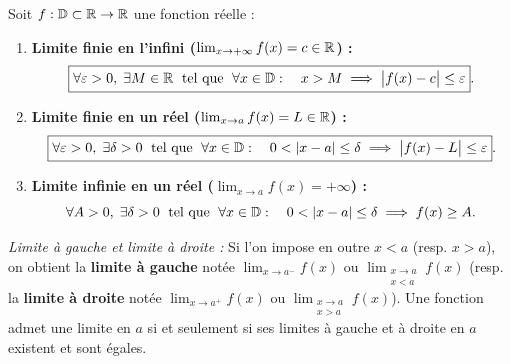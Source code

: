 \begin{definition}
Soit $f : \mathbb{D} \subset \mathbb{R} \to \mathbb{R}$ une fonction réelle :
\begin{enumerate}
    \item \textbf{Limite finie en l'infini ($\lim_{x \to +\infty} f(x) = c \in \mathbb{R}$) :}
    \[
        \boxed{\forall \varepsilon > 0, \;\exists M \in \mathbb{R} \;\text{ tel que }\; \forall x \in \mathbb{D} : \quad x > M \implies \bigl|f(x) - c\bigr| \le \varepsilon}.
    \]
    \item \textbf{Limite finie en un réel ($\lim_{x \to a} f(x) = L \in \mathbb{R}$) :}
    \[
        \boxed{\forall \varepsilon > 0, \;\exists \delta > 0 \;\text{ tel que }\; \forall x \in \mathbb{D} : \quad 0 < |x - a| \le \delta \implies \bigl|f(x) - L\bigr| \le \varepsilon}.
    \]
    \item \textbf{Limite infinie en un réel ($\lim_{x \to a} f(x) = +\infty$) :}
    \[
        \forall A > 0, \;\exists \delta > 0 \;\text{ tel que }\; \forall x \in \mathbb{D} : \quad 0 < |x - a| \le \delta \implies f(x) \ge A.
    \]
\end{enumerate}
\emph{Limite à gauche et limite à droite :} Si l'on impose en outre $x < a$ (resp. $x > a$), on obtient la \textbf{limite à gauche} notée $\lim_{x \to a^-} f(x)$ ou $\lim_{\substack{x \to a \\ x < a}} f(x)$ (resp. la \textbf{limite à droite} notée $\lim_{x \to a^+} f(x)$ ou $\lim_{\substack{x \to a \\ x > a}} f(x)$). Une fonction admet une limite en $a$ si et seulement si ses limites à gauche et à droite en $a$ existent et sont égales.
\end{definition}

